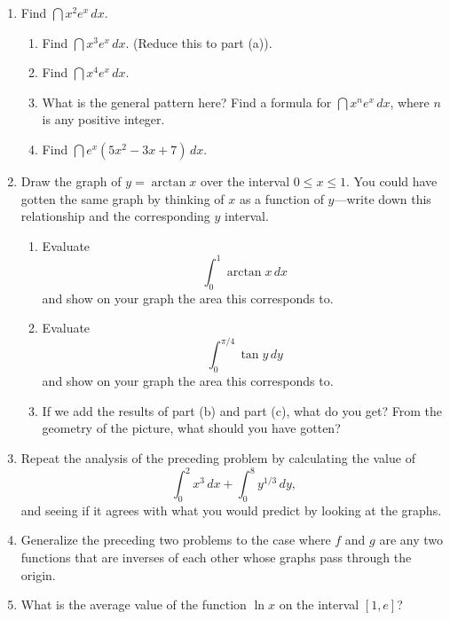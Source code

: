 \begin{enumerate}
\item Find $\dint x^2 e^x \, dx$.

  \begin{enumerate}
  \item Find $\dint x^3 e^x \, dx$.  (Reduce this to part (a)).

  \item Find $\dint x^4 e^x \, dx$.

  \item What is the general pattern here?  Find a formula for $\dint x^n e^x \, dx$, where $n$ is any positive integer.

  \item Find $\dint e^x \left(5x^2 - 3x + 7\right) \, dx$.


\end{enumerate}
\item Draw the graph of $y=\arctan{x}$ over the interval $0\leq x\leq
1$.  You could have gotten the same graph by thinking of $x$ as a
function of $y$---write down this relationship and the corresponding
$y$ interval.

  \begin{enumerate}
  \item Evaluate
\[
\int_0^1 \arctan{x}\,dx
\]
and show on your graph the area this corresponds to.

  \item Evaluate
\[
\int_0^{\pi/4} \tan{y}\,dy
\]
and show on your graph the area this corresponds to.

  \item If we add the results of part (b) and part (c), what do you get?
From the geometry of the picture, what should you have gotten?


\end{enumerate}
\item Repeat the analysis of the preceding problem by calculating the
value of
\[
\int_0^2 x^3\,dx+\int_0^8 y^{1/3}\,dy,
\]
and seeing if it agrees with what you would predict by looking at the
graphs.




\item Generalize the preceding two problems to the case where $f$ and
$g$ are any two functions that are inverses of each other whose graphs
pass through the origin.



\item What is the average value of the function $\ln{x}$ on the
interval $[1, e]$?


\end{enumerate}
